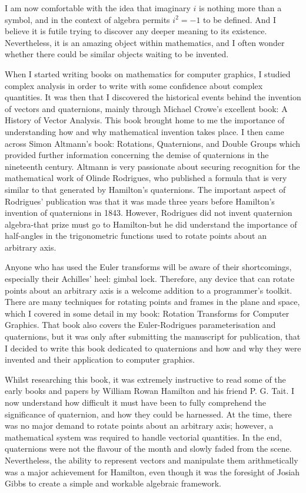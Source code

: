 \documentclass[10pt]{article}
\begin{document}
I am now comfortable with the idea that imaginary $i$ is nothing more than a symbol, and in the context of algebra permits $i^{2}=-1$ to be defined. And I believe it is futile trying to discover any deeper meaning to its existence. Nevertheless, it is an amazing object within mathematics, and I often wonder whether there could be similar objects waiting to be invented.

When I started writing books on mathematics for computer graphics, I studied complex analysis in order to write with some confidence about complex quantities. It was then that I discovered the historical events behind the invention of vectors and quaternions, mainly through Michael Crowe's excellent book: A History of Vector Analysis. This book brought home to me the importance of understanding how and why mathematical invention takes place. I then came across Simon Altmann's book: Rotations, Quaternions, and Double Groups which provided further information concerning the demise of quaternions in the nineteenth century. Altmann is very passionate about securing recognition for the mathematical work of Olinde Rodrigues, who published a formula that is very similar to that generated by Hamilton's quaternions. The important aspect of Rodrigues' publication was that it was made three years before Hamilton's invention of quaternions in 1843. However, Rodrigues did not invent quaternion algebra-that prize must go to Hamilton-but he did understand the importance of half-angles in the trigonometric functions used to rotate points about an arbitrary axis.

Anyone who has used the Euler transforms will be aware of their shortcomings, especially their Achilles' heel: gimbal lock. Therefore, any device that can rotate points about an arbitrary axis is a welcome addition to a programmer's toolkit. There are many techniques for rotating points and frames in the plane and space, which I covered in some detail in my book: Rotation Transforms for Computer Graphics. That book also covers the Euler-Rodrigues parameterisation and quaternions, but it was only after submitting the manuscript for publication, that I decided to write this book dedicated to quaternions and how and why they were invented and their application to computer graphics.

Whilst researching this book, it was extremely instructive to read some of the early books and papers by William Rowan Hamilton and his friend P. G. Tait. I now understand how difficult it must have been to fully comprehend the significance of quaternion, and how they could be harnessed. At the time, there was no major demand to rotate points about an arbitrary axis; however, a mathematical system was required to handle vectorial quantities. In the end, quaternions were not the flavour of the month and slowly faded from the scene. Nevertheless, the ability to represent vectors and manipulate them arithmetically was a major achievement for Hamilton, even though it was the foresight of Josiah Gibbs to create a simple and workable algebraic framework.
\end{document}
